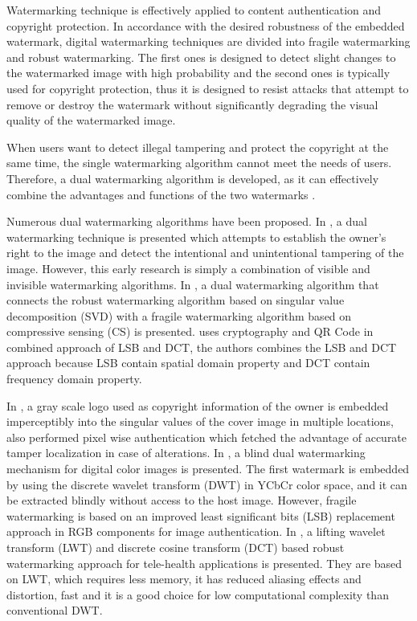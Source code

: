 \documentclass[runningheads]{llncs}
\begin{document}
Watermarking technique is effectively applied to content authentication and copyright protection. In accordance with the desired robustness of the embedded watermark, digital watermarking techniques are divided into fragile watermarking and robust watermarking. The first ones is designed to detect slight changes to the watermarked image with high probability and the second ones is typically used for copyright protection, thus it is designed to resist attacks that attempt to remove or destroy the watermark without significantly degrading the visual quality of the watermarked image.

When users want to detect illegal tampering and protect the copyright at the same time, the single watermarking algorithm cannot meet the needs of users. Therefore, a dual watermarking algorithm is developed, as it can effectively combine the advantages and functions of the two watermarks \cite{wang2017dual}.

Numerous dual watermarking algorithms have been proposed. In \cite{mohanty1999dual}, a dual watermarking technique is presented which attempts to establish the owner’s right to the image and detect the intentional and unintentional tampering of the image. However, this early research is simply a combination of visible and invisible watermarking algorithms. In \cite{wang2017dual},  a dual watermarking algorithm that connects the robust watermarking algorithm based on singular value decomposition (SVD) with a fragile watermarking algorithm based on compressive sensing (CS) is presented. \cite{singh2018hybrid} uses cryptography and QR Code in combined approach of LSB and DCT, the authors combines the LSB and DCT approach because LSB contain spatial domain property and DCT contain frequency domain property.

In \cite{shivani2017dual}, a gray scale logo used as copyright information of the owner is embedded imperceptibly into the singular values of the cover image in multiple locations, also performed pixel wise authentication which fetched the advantage of accurate tamper localization in case of alterations. In \cite{liu2018blind}, a blind dual watermarking mechanism for digital color images is presented. The first watermark is embedded by using the discrete wavelet transform (DWT) in YCbCr color space, and it can be extracted blindly without access to the host image. However, fragile watermarking is based on an improved least significant bits (LSB) replacement approach in RGB components for image authentication. In \cite{singh2019robust}, a lifting wavelet transform (LWT) and discrete cosine transform (DCT) based robust watermarking approach for tele-health applications is presented. They are based on LWT, which requires less memory, it has reduced aliasing effects and distortion, fast and it is a good choice for low computational complexity than conventional DWT.
\end{document}
